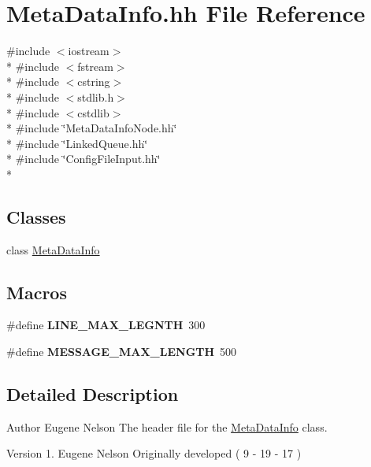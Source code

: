 \hypertarget{_meta_data_info_8hh}{\section{Meta\-Data\-Info.\-hh File Reference}
\label{_meta_data_info_8hh}
}
{\ttfamily \#include $<$iostream$>$}\\*
{\ttfamily \#include $<$fstream$>$}\\*
{\ttfamily \#include $<$cstring$>$}\\*
{\ttfamily \#include $<$stdlib.\-h$>$}\\*
{\ttfamily \#include $<$cstdlib$>$}\\*
{\ttfamily \#include \char`\"{}Meta\-Data\-Info\-Node.\-hh\char`\"{}}\\*
{\ttfamily \#include \char`\"{}Linked\-Queue.\-hh\char`\"{}}\\*
{\ttfamily \#include \char`\"{}Config\-File\-Input.\-hh\char`\"{}}\\*
\subsection*{Classes}
\begin{DoxyCompactItemize}
\item 
class \hyperlink{class_meta_data_info}{Meta\-Data\-Info}
\end{DoxyCompactItemize}
\subsection*{Macros}
\begin{DoxyCompactItemize}
\item 
\hypertarget{_meta_data_info_8hh_a828e76c4673f1a0757e0380a5cf50325}{\#define {\bfseries L\-I\-N\-E\-\_\-\-M\-A\-X\-\_\-\-L\-E\-G\-N\-T\-H}~300}\label{_meta_data_info_8hh_a828e76c4673f1a0757e0380a5cf50325}

\item 
\hypertarget{_meta_data_info_8hh_ad266dc7dec611fa99e4f2737d85deb17}{\#define {\bfseries M\-E\-S\-S\-A\-G\-E\-\_\-\-M\-A\-X\-\_\-\-L\-E\-N\-G\-T\-H}~500}\label{_meta_data_info_8hh_ad266dc7dec611fa99e4f2737d85deb17}

\end{DoxyCompactItemize}


\subsection{Detailed Description}
\begin{DoxyAuthor}{Author}
Eugene Nelson  The header file for the \hyperlink{class_meta_data_info}{Meta\-Data\-Info} class. 
\end{DoxyAuthor}
\begin{DoxyVersion}{Version}
1. Eugene Nelson Originally developed ( 9 -\/ 19 -\/ 17 ) 
\end{DoxyVersion}
